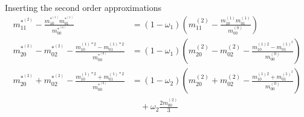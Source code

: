 Inserting the second order approximations
\begin{equation}
  \begin{aligned}
    m_{11}^{*^{(2)}} - \frac{ m_{10}^{*^{(1)}}m_{01}^{*^{(1)}}}{m_{00}^{*^{(0)}}} & = (1-\omega_1)\left(m_{11}^{(2)} - \frac{ m_{10}^{(1)}m_{01}^{(1)}}{m_{00}^{(0)}}\right) \\
    m_{20}^{*^{(2)}}-m_{02}^{*^{(2)}} - \frac{ m_{10}^{(1)*2} - m_{01}^{(1)*2}}{m_{00}^{*^{(0)}}} & = (1-\omega_1) \left(m_{20}^{(2)}-m_{02}^{(2)} - \frac{ m_{10}^{(1)2} - m_{01}^{{(1)}^2}}{m_{00}^{(0)}}\right) \\
    m_{20}^{*^{(2)}}+m_{02}^{*^{(2)}} - \frac{ m_{10}^{(1)*2} + m_{01}^{(1)*2}}{m_{00}^{*^{(0)}}} & = (1-\omega_2)
    \left(m_{20}^{(2)}+m_{02}^{(2)} - \frac{ m_{10}^{(1)2} + m_{01}^{{(1)}^2}}{m_{00}^{(0)}}\right)
    \\&\quad
    + \omega_2 \frac{2 m_{00}^{(2)}}{3} \\
  \end{aligned}
\end{equation}

